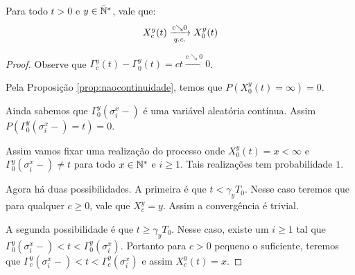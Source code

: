 \begin{lema}
  \label{lema:c_continuo}
  Para todo $t > 0$ e $y \in {\mathbb{\bar{N}^*}}$, vale que:
  \begin{displaymath}
    X_c^y(t) \xrightarrow[{\emph{q.c.}}]{c\searrow 0} X_0^y(t)
  \end{displaymath}
\end{lema}
\begin{proof}
  Observe que $\Gamma^y_c (t) - \Gamma^y_0(t) = ct \xrightarrow{c
    \searrow 0} 0$.

  Pela Proposição \ref{prop:naocontinuidade}, temos que $P(X^y_0(t) =
  \infty) = 0$.

  Ainda sabemos que $\Gamma^y_0(\sigma^x_i-)$ é uma variável aleatória
  contínua. Assim $P( \Gamma^y_0(\sigma^x_i-) = t) = 0$.

  Assim vamos fixar uma realização do processo onde
  $X^y_0(t) = x < \infty$ e $\Gamma^y_0(\sigma^x_i-) \neq t$ para todo
  $x \in {\mathbb{N^*}}$ e $i \geq 1$. Tais realizações tem probabilidade $1$.


  Agora há duas possibilidades. A primeira é que $t < \gamma_y
  T_0$. Nesse caso teremos que para qualquer $c \geq 0$, vale que
  $X^y_c = y$. Assim a convergência é trivial.

  A segunda possibilidade é que $t \geq \gamma_y T_0$. Nesse caso,
  existe um $i \geq 1$ tal que $\Gamma^y_0(\sigma^x_i-) < t <
  \Gamma^y_0(\sigma^x_i)$. Portanto para $c > 0$ pequeno o suficiente,
  teremos que $\Gamma^y_c(\sigma^x_i-) < t < \Gamma^y_c(\sigma^x_i)$ e
  assim $X_c^y(t) = x$.
\end{proof}

